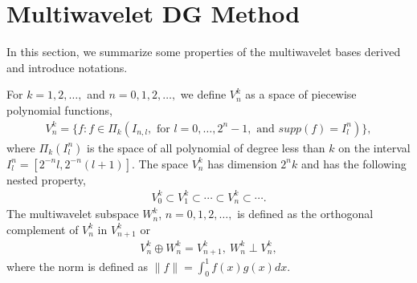 \documentclass[final,leqno]{siamltex704}
\newcommand{\bn}{{\bf n}}
\def\bn{{\bf n}}
\def\bE{{\bf E}}
\def\bB{{\bf B}}
\begin{document}
%


\section{Multiwavelet DG Method}
In this section, we summarize some properties of the multiwavelet bases derived and introduce notations. 

For $k=1,2,\dots,$ and $n=0,1,2,\dots,$ we define $V_n^k$ as a space of piecewise polynomial functions,
\begin{eqnarray}
V_n^k=\{f:f\in\Pi_k(I_{n,l},\text{ for }l=0,\dots,2^n-1,\text{ and }supp(f)=I_l^n)\},
\end{eqnarray}
where $\Pi_k(I_l^n)$ is the space of all polynomial of degree less than $k$ on the interval $I_l^n=[2^{-n}l,2^{-n}(l+1)]$. The space $V_n^k$ has dimension $2^nk$ and has the following nested property,
\begin{eqnarray}
V_0^k\subset V_1^k\subset\cdots\subset V_n^k\subset \cdots.
\end{eqnarray}
The multiwavelet subspace $W_n^k$, $n=0,1,2,\dots,$ is defined as the orthogonal complement of $V_n^k$ in $V_{n+1}^k$ or
\begin{eqnarray}
V_n^k\oplus W_n^k=V_{n+1}^k,\ W_n^k\perp V_n^k,
\end{eqnarray}
where the norm is defined as $\|f\|=\int_0^1 f(x)g(x)dx.$ 
\end{document}
